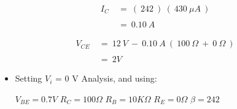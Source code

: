 \begin{flushright}
{\bfseries\itshape{}} \hfill \break
\end{flushright} \hfill

\begin{ceqn}
\begin{align}
I_{C}\ &=\ (\ 242\ )\ (\ 430\ \mu A\ ) \\ \\
&=\ 0.10\ A
\end{align}
\end{ceqn} \hfill \break

\pagebreak

{\bfseries\itshape{}} 

\begin{flushright}
{\bfseries\itshape{}} \hfill \break
\end{flushright}

\begin{ceqn}
\begin{align}
V_{CE}\ &=\ 12\ V\ -\ 0.10\ A\ (\ 100\ \Omega\ +\ 0\ \Omega\ ) \\ \\
&=\ 2 V
\end{align}
\end{ceqn} \hfill \break

\pagebreak

{\bfseries\itshape
\begin{itemize}
\item Setting $V_{i}$ = 0 V Analysis, and using:
\begin{tasks}
\task $V_{BE} =  0.7 V$
\task $R_{C} = 100 \Omega$ 
\task $R_{B} = 10K \Omega$ 
\task $R_{E} = 0 \Omega$ 
\task $\beta = 242$ 
\end{tasks}
\end{itemize}} \hfill \break

{\bfseries\itshape{}}

\begin{flushright}
{\bfseries\itshape{}} \hfill \break
\end{flushright}

